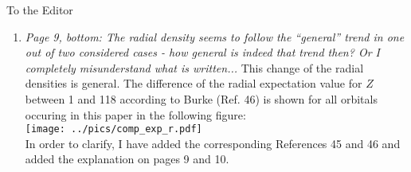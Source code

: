 \documentclass[DIN,pagenumber=false,parskip=half,fromalign=left,fromphone=false,fromemail=true,fromurl=false,fromlogo=false,fromrule=false]{scrlttr2}
\begin{document}
\begin{letter}{To the Editor}
\begin{enumerate}
       result in a numerical error of \unit[2.5]{\%} for strontium
       and \unit[3.0]{\%}
       However, since this observation is not based on physical
       reasoning but only on two numerical data points, I will only indicate that
       this assignment may give an idea about the numerical error and leave the prove
       to future studies to be based on a robust data set.
 \item \emph{Page 9, bottom: The radial density seems to follow the ``general''
             trend in one out of two considered cases - how general is indeed that
             trend then? Or I completely misunderstand what is written... } \newline
             This change of the radial densities is general.
             The difference of the radial expectation value for $Z$ between
             1 and 118 according to Burke
             (Ref. 46) is shown for all orbitals occuring in this paper in the
             following figure:\\
             \texttt{[image: ../pics/comp\_exp\_r.pdf]}\\
             In order to clarify, I have added the corresponding References 45 and 46
             and added the explanation on pages 9 and 10.
             

\end{enumerate}
\end{letter}
\end{document}
